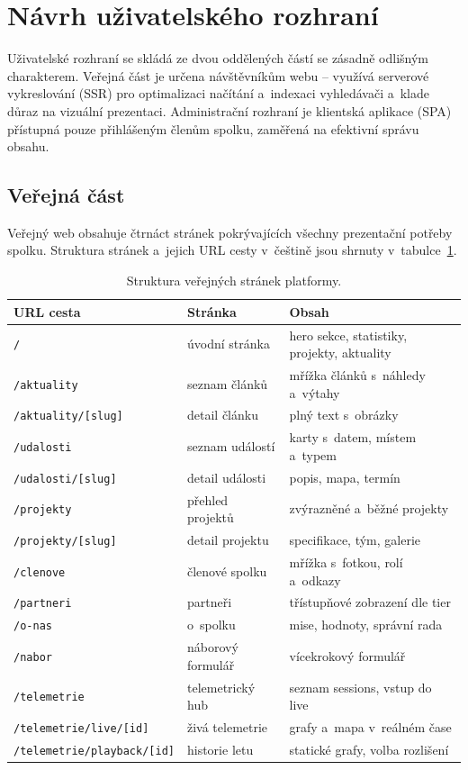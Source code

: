 \section{Návrh uživatelského rozhraní}

Uživatelské rozhraní se skládá ze dvou oddělených částí se zásadně odlišným charakterem. Veřejná část je určena návštěvníkům webu -- využívá serverové vykreslování (SSR) pro optimalizaci načítání a~indexaci vyhledávači a~klade důraz na vizuální prezentaci. Administrační rozhraní je klientská aplikace (SPA) přístupná pouze přihlášeným členům spolku, zaměřená na efektivní správu obsahu.

\subsection{Veřejná část}
\label{sec:navrh-verejne-stranky}

\begin{sloppypar}
Veřejný web obsahuje čtrnáct stránek pokrývajících všechny prezentační potřeby spolku. Struktura stránek a~jejich URL cesty v~češtině jsou shrnuty v~tabulce~\ref{tab:public-routes}.
\end{sloppypar}

\begin{table}[ht]
\centering
\footnotesize
\begin{tabular}{lll}
\hline
\textbf{URL cesta} & \textbf{Stránka} & \textbf{Obsah} \\
\hline
\texttt{/} & úvodní stránka & hero sekce, statistiky, projekty, aktuality \\
\texttt{/aktuality} & seznam článků & mřížka článků s~náhledy a~výtahy \\
\texttt{/aktuality/[slug]} & detail článku & plný text s~obrázky \\
\texttt{/udalosti} & seznam událostí & karty s~datem, místem a~typem \\
\texttt{/udalosti/[slug]} & detail události & popis, mapa, termín \\
\texttt{/projekty} & přehled projektů & zvýrazněné a~běžné projekty \\
\texttt{/projekty/[slug]} & detail projektu & specifikace, tým, galerie \\
\texttt{/clenove} & členové spolku & mřížka s~fotkou, rolí a~odkazy \\
\texttt{/partneri} & partneři & třístupňové zobrazení dle tier \\
\texttt{/o-nas} & o~spolku & mise, hodnoty, správní rada \\
\texttt{/nabor} & náborový formulář & vícekrokový formulář \\
\texttt{/telemetrie} & telemetrický hub & seznam sessions, vstup do live \\
\texttt{/telemetrie/live/[id]} & živá telemetrie & grafy a~mapa v~reálném čase \\
\texttt{/telemetrie/playback/[id]} & historie letu & statické grafy, volba rozlišení \\
\hline
\end{tabular}
\caption{Struktura veřejných stránek platformy.}
\label{tab:public-routes}
\end{table}

